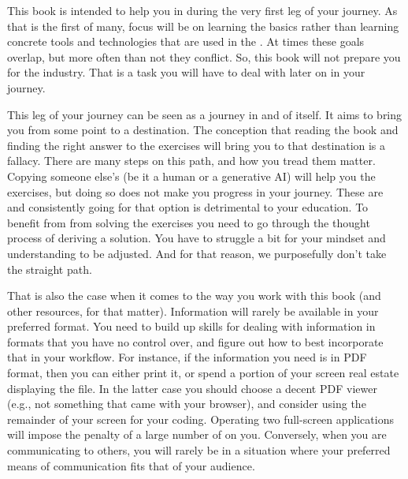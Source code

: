 This book is intended to help you in during the very first leg of your journey. As that is the first of many, focus will be on learning the basics rather than learning concrete tools and technologies that are used in the . At times these goals overlap, but more often than not they conflict. So, this book will not prepare you for the industry. That is a task you will have to deal with later on in your journey.

This leg of your journey can be seen as a journey in and of itself. It aims to bring you from some point to a destination. The conception that reading the book and finding the right answer to the exercises will bring you to that destination is a fallacy. There are many steps on this path, and how you tread them matter.
Copying someone else's  (be it a human or a generative AI) will help you  the exercises, but doing so does not make you progress in your journey. These are  and consistently going for that option is detrimental to your education. To benefit from from solving the exercises you need to go through the thought process of deriving a solution. You have to struggle a bit for your mindset and understanding to be adjusted. And for that reason, we purposefully don't take the straight path.

That is also the case when it comes to the way you work with this book (and other resources, for that matter). Information will rarely be available in your preferred format. You need to build up skills for dealing with information in formats that you have no control over, and figure out how to best incorporate that in your workflow. For instance, if the information you need is in PDF format, then you can either print it, or spend a portion of your screen real estate displaying the file. In the latter case you should choose a decent PDF viewer (e.g., not something that came with your browser), and consider using the remainder of your screen for your coding. Operating two full-screen applications will impose the penalty of a large number of  on you. Conversely, when you are communicating to others, you will rarely be in a situation where your preferred means of communication fits that of your audience.

